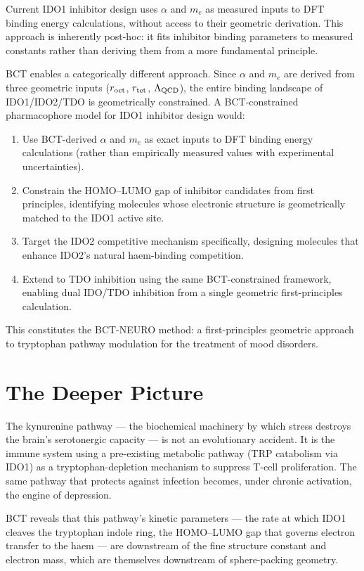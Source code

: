 \documentclass[aps,prl,preprint,superscriptaddress,floatfix]{revtex4-2}
\begin{document}
Current IDO1 inhibitor design uses $\alpha$ and $m_e$ as measured inputs
to DFT binding energy calculations, without access to their geometric
derivation. This approach is inherently post-hoc: it fits inhibitor
binding parameters to measured constants rather than deriving them from
a more fundamental principle.

BCT enables a categorically different approach. Since $\alpha$ and $m_e$
are derived from three geometric inputs ($r_{\rm oct}$, $r_{\rm tet}$,
$\Lambda_{\rm QCD}$), the entire binding landscape of IDO1/IDO2/TDO is
geometrically constrained. A BCT-constrained pharmacophore model for
IDO1 inhibitor design would:

\begin{enumerate}
\item Use BCT-derived $\alpha$ and $m_e$ as exact inputs to DFT binding
  energy calculations (rather than empirically measured values with
  experimental uncertainties).
\item Constrain the HOMO--LUMO gap of inhibitor candidates from first
  principles, identifying molecules whose electronic structure is
  geometrically matched to the IDO1 active site.
\item Target the IDO2 competitive mechanism specifically, designing
  molecules that enhance IDO2's natural haem-binding competition.
\item Extend to TDO inhibition using the same BCT-constrained framework,
  enabling dual IDO/TDO inhibition from a single geometric first-principles
  calculation.
\end{enumerate}

This constitutes the BCT-NEURO method: a first-principles geometric
approach to tryptophan pathway modulation for the treatment of mood disorders.

\section{The Deeper Picture}

The kynurenine pathway --- the biochemical machinery by which stress
destroys the brain's serotonergic capacity --- is not an evolutionary
accident. It is the immune system using a pre-existing metabolic pathway
(TRP catabolism via IDO1) as a tryptophan-depletion mechanism to suppress
T-cell proliferation. The same pathway that protects against infection
becomes, under chronic activation, the engine of depression.

BCT reveals that this pathway's kinetic parameters --- the rate at which
IDO1 cleaves the tryptophan indole ring, the HOMO--LUMO gap that governs
electron transfer to the haem --- are downstream of the fine structure
constant and electron mass, which are themselves downstream of sphere-packing
geometry.
\end{document}
